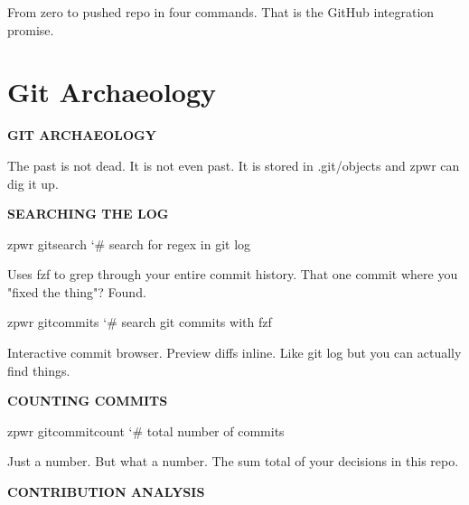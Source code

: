 \documentclass[11pt,a4paper,twoside]{book}
\begin{document}
From zero to pushed repo in four commands. That is the GitHub integration promise.


\vspace{16pt}

\section{Git Archaeology}


\vspace{10pt}
{\large\bfseries\color{neoncyan} GIT ARCHAEOLOGY}\vspace{6pt}

The past is not dead. It is not even past. It is stored in .git/objects and zpwr can dig it up.


\vspace{12pt}
{\bfseries\color{neonyellow} SEARCHING THE LOG}\vspace{4pt}

\begin{codebox}
\color{neongreen}zpwr gitsearch             {\char`\#} search for regex in git log\\
\end{codebox}

Uses fzf to grep through your entire commit history. That one commit where you "fixed the thing"? Found.

\begin{codebox}
\color{neongreen}zpwr gitcommits            {\char`\#} search git commits with fzf\\
\end{codebox}

Interactive commit browser. Preview diffs inline. Like git log but you can actually find things.


\vspace{12pt}
{\bfseries\color{neonyellow} COUNTING COMMITS}\vspace{4pt}

\begin{codebox}
\color{neongreen}zpwr gitcommitcount        {\char`\#} total number of commits\\
\end{codebox}

Just a number. But what a number. The sum total of your decisions in this repo.


\vspace{12pt}
{\bfseries\color{neonyellow} CONTRIBUTION ANALYSIS}\vspace{4pt}
\end{document}
